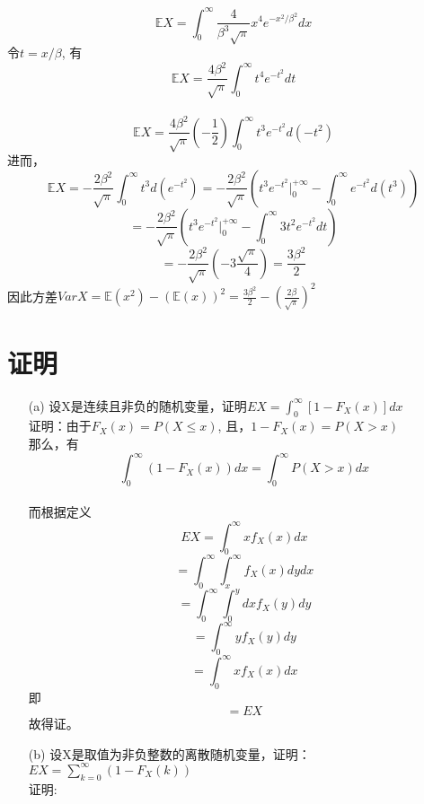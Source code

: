 \documentclass [12pt]{article}
\begin{document}
\begin{CJK*}{GBK}{kai}
\begin{enumerate}
	
	$$\mathbb{E}X=\int_{0}^{\infty}{\frac{4}{\beta^{3}\sqrt{\pi}}x^{4}e^{-x^2/\beta^{2}}}dx $$
      令$t=x/\beta$, 有$$\mathbb{E}X=\frac{4\beta^2}{\sqrt{\pi}}  \int_{0}^{\infty}{t^{4}e^{-t^{2}}}dt $$\\
     $$\mathbb{E}X=\frac{4\beta^2}{\sqrt{\pi}} (-\frac{1}{2}) \int_{0}^{\infty}{ t^3 e^{-t^2}}d(-t^2) $$
      进而，$$\mathbb{E}X=-\frac{2\beta^2}{\sqrt{\pi}} \int_{0}^{\infty}{  t^3 d(e^{-t^2})} = -\frac{2\beta^2}{\sqrt{\pi}} \left(  t^3 e^{-t^2} \vert_{0}^{+\infty }  - \int_{0}^{\infty}{ e^{-t^2}}d(t^3) \right) $$
      $$= -\frac{2\beta^2}{\sqrt{\pi}} \left(  t^3 e^{-t^2} \vert_{0}^{+\infty }  - \int_{0}^{\infty}{3 t^2 e^{-t^2}}dt \right) $$
      $$= -\frac{2\beta^2}{\sqrt{\pi}} \left(-3 \frac{\sqrt{\pi}}{4} \right)  = \frac{3\beta^2}{2} $$
	因此方差$VarX=\mathbb{E}(x^2)-(\mathbb{E}(x))^2 =\frac{3\beta^2}{2} - (\frac{2\beta}{\sqrt{\pi}})^2$
	
\end{enumerate}	
\section{证明}
 \begin{enumerate}
  \item[(a)] 设X是连续且非负的随机变量，证明$EX=\int_{0}^{\infty}{[1-F_{X}(x)]dx}$\\
  证明：由于$F_{X}(x)=P(X \le x)$, 且，$1-F_{X}(x)=P(X > x)$\\
  
  那么，有$$\int_{0}^{\infty}{(1-F_{X}(x))dx}=\int_{0}^{\infty}{P(X > x)dx}$$\\
  而根据定义$$EX= \int_{0}^{\infty}{xf_{X}(x)dx}$$
  $$ = \int_{0}^{\infty}{\int_{x}^{\infty}{f_{X}(x)dydx}}$$
  $$ = \int_{0}^{\infty}{\int_{0}^{y}{dxf_{X}(y)dy}}$$ 
  $$ = \int_{0}^{\infty}{yf_{X}(y)dy}$$ 
  $$ = \int_{0}^{\infty}{xf_{X}(x)dx}$$ 
  即$$ = EX$$ 
  故得证。
  
  \item[(b)] 设X是取值为非负整数的离散随机变量，证明：$EX=\sum_{k=0}^{\infty}{(1-F_{X}(k))}$\\
  证明:
\end{enumerate}



\end{CJK*}
\end{document}

